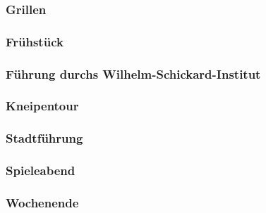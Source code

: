 \subsubsection*{Grillen}
\subsubsection*{Frühstück}
\subsubsection*{Führung durchs Wilhelm-Schickard-Institut}
\subsubsection*{Kneipentour}
\subsubsection*{Stadtführung}
\subsubsection*{Spieleabend}
\subsubsection*{Wochenende}
